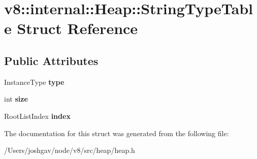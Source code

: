 \hypertarget{structv8_1_1internal_1_1_heap_1_1_string_type_table}{}\section{v8\+:\+:internal\+:\+:Heap\+:\+:String\+Type\+Table Struct Reference}
\label{structv8_1_1internal_1_1_heap_1_1_string_type_table}
\subsection*{Public Attributes}
\begin{DoxyCompactItemize}
\item 
Instance\+Type {\bfseries type}\hypertarget{structv8_1_1internal_1_1_heap_1_1_string_type_table_a8cd979571c597218f3ed450576023c5d}{}\label{structv8_1_1internal_1_1_heap_1_1_string_type_table_a8cd979571c597218f3ed450576023c5d}

\item 
int {\bfseries size}\hypertarget{structv8_1_1internal_1_1_heap_1_1_string_type_table_aac7e45cc564374ca3e531a7f679e0e34}{}\label{structv8_1_1internal_1_1_heap_1_1_string_type_table_aac7e45cc564374ca3e531a7f679e0e34}

\item 
Root\+List\+Index {\bfseries index}\hypertarget{structv8_1_1internal_1_1_heap_1_1_string_type_table_a615bc2cab1ca100b4da40e641680d045}{}\label{structv8_1_1internal_1_1_heap_1_1_string_type_table_a615bc2cab1ca100b4da40e641680d045}

\end{DoxyCompactItemize}


The documentation for this struct was generated from the following file\+:\begin{DoxyCompactItemize}
\item 
/\+Users/joshgav/node/v8/src/heap/heap.\+h\end{DoxyCompactItemize}
